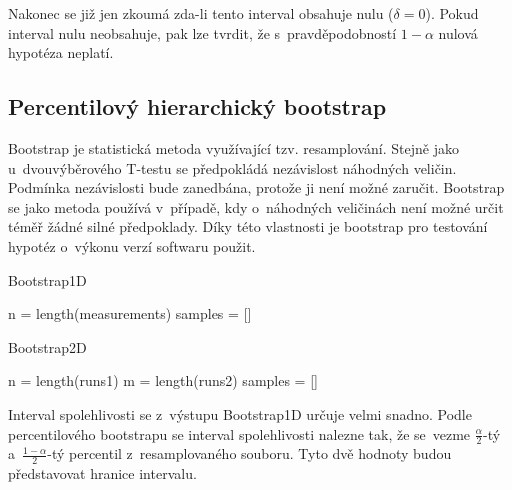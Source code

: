 Nakonec se již jen zkoumá zda-li tento interval obsahuje nulu ($\delta = 0$).
Pokud interval nulu neobsahuje, pak lze tvrdit, že s~pravděpodobností $1-\alpha$
nulová hypotéza neplatí.

\subsection{Percentilový hierarchický bootstrap}


Bootstrap je statistická metoda využívající tzv. resamplování.
Stejně jako u~dvouvýběrového T-testu se předpokládá nezávislost náhodných veličin.
Podmínka nezávislosti bude zanedbána, protože ji není možné zaručit.
Bootstrap se jako metoda používá v~případě, kdy o~náhodných veličinách není možné
určit téměř žádné silné předpoklady. Díky této vlastnosti je bootstrap pro testování
hypotéz o~výkonu verzí softwaru použit.

\begin{algorithm}[h!]
    \caption{Bootstrap1D}
    
    n = length(measurements)\;
    samples = []\;

    
    \;
\end{algorithm}

\begin{algorithm}[h!]
    \caption{Bootstrap2D}
    
    n = length(runs1)\;
    m = length(runs2)\;
    samples = []\;

    
    \;
\end{algorithm}

Interval spolehlivosti se z~výstupu Bootstrap1D určuje velmi snadno.
Podle percentilového bootstrapu se interval spolehlivosti nalezne tak, že se~vezme $\frac{\alpha}{2}$-tý
a~$\frac{1-\alpha}{2}$-tý percentil z~resamplovaného souboru. Tyto dvě hodnoty budou představovat hranice intervalu.

